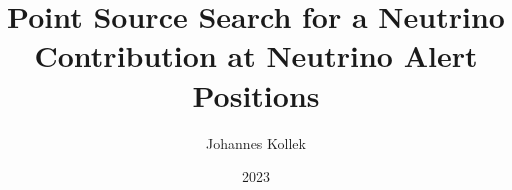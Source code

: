 \documentclass[
  tucolor,       %
  BCOR=12mm,     %
  parskip=half,  %
  open=any,      %
  cleardoublepage=plain,  %
]{tudothesis}
\author{Johannes Kollek}
\title{Point Source Search for a Neutrino Contribution at Neutrino Alert Positions}
\date{2023}
\begin{document}
\frontmatter
%
\maketitle

\makecorrectorpage


\tableofcontents

\mainmatter










%
%
%

\appendix


\backmatter
\printbibliography

\cleardoublepage

%
\end{document}
